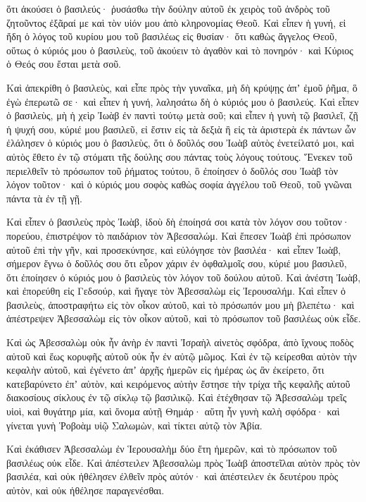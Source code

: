 {ὅτι ἀκούσει ὁ βασιλεύς· ῥυσάσθω τὴν δούλην αὐτοῦ ἐκ χειρὸς τοῦ ἀνδρὸς τοῦ ζητοῦντος ἐξᾶραί με καὶ τὸν υἱόν μου ἀπὸ κληρονομίας Θεοῦ.
Καὶ εἶπεν ἡ γυνή, εἰ ἤδη ὁ λόγος τοῦ κυρίου μου τοῦ βασιλέως εἰς θυσίαν· ὅτι καθὼς ἄγγελος Θεοῦ, οὕτως ὁ κύριός μου ὁ βασιλεὺς, τοῦ ἀκούειν τὸ ἀγαθὸν καὶ τὸ πονηρόν· καὶ Κύριος ὁ Θεός σου ἔσται μετὰ σοῦ.
\par }{\PP {}Καὶ ἀπεκρίθη ὁ βασιλεὺς, καὶ εἶπε πρὸς τὴν γυναῖκα, μὴ δὴ κρύψῃς ἀπʼ ἐμοῦ ῥῆμα, ὃ ἐγὼ ἐπερωτῶ σε· καὶ εἶπεν ἡ γυνή, λαλησάτω δὴ ὁ κύριός μου ὁ βασιλεύς.
Καὶ εἶπεν ὁ βασιλεὺς, μὴ ἡ χεὶρ Ἰωὰβ ἐν παντὶ τούτῳ μετὰ σοῦ; καὶ εἶπεν ἡ γυνὴ τῷ βασιλεῖ, ζῇ ἡ ψυχή σου, κύριέ μου βασιλεῦ, εἰ ἔστιν εἰς τὰ δεξιὰ ἢ εἰς τὰ ἀριστερὰ ἐκ πάντων ὧν ἐλάλησεν ὁ κύριός μου ὁ βασιλεὺς, ὅτι ὁ δοῦλός σου Ἰωὰβ αὐτὸς ἐνετείλατό μοι, καὶ αὐτὸς ἔθετο ἐν τῷ στόματι τῆς δούλης σου πάντας τοὺς λόγους τούτους.
Ἕνεκεν τοῦ περιελθεῖν τὸ πρόσωπον τοῦ ῥήματος τούτου, ὃ ἐποίησεν ὁ δοῦλός σου Ἰωὰβ τὸν λόγον τοῦτον· καὶ ὁ κύριός μου σοφὸς καθὼς σοφία ἀγγέλου τοῦ Θεοῦ, τοῦ γνῶναι πάντα τὰ ἐν τῇ γῇ.
\par }{\PP {}Καὶ εἶπεν ὁ βασιλεὺς πρὸς Ἰωὰβ, ἰδοὺ δὴ ἐποίησά σοι κατὰ τὸν λόγον σου τοῦτον· πορεύου, ἐπιστρέψον τὸ παιδάριον τὸν Ἀβεσσαλώμ.
Καὶ ἔπεσεν Ἰωὰβ ἐπὶ πρόσωπον αὐτοῦ ἐπὶ τὴν γῆν, καὶ προσεκύνησε, καὶ εὐλόγησε τὸν βασιλέα· καὶ εἶπεν Ἰωὰβ, σήμερον ἔγνω ὁ δοῦλός σου ὅτι εὗρον χάριν ἐν ὀφθαλμοῖς σου, κύριέ μου βασιλεῦ, ὅτι ἐποίησεν ὁ κύριός μου ὁ βασιλεὺς τὸν λόγον τοῦ δούλου αὐτοῦ.
Καὶ ἀνέστη Ἰωὰβ, καὶ ἐπορεύθη εἰς Γεδσούρ, καὶ ἤγαγε τὸν Ἀβεσσαλὼμ εἰς Ἰερουσαλήμ.
Καὶ εἶπεν ὁ βασιλεὺς, ἀποστραφήτω εἰς τὸν οἶκον αὐτοῦ, καὶ τὸ πρόσωπόν μου μὴ βλεπέτω· καὶ ἀπέστρεψεν Ἀβεσσαλὼμ εἰς τὸν οἶκον αὐτοῦ, καὶ τὸ πρόσωπον τοῦ βασιλέως οὐκ εἶδε.
\par }{\PP {}Καὶ ὡς Ἀβεσσαλὼμ οὐκ ἦν ἀνὴρ ἐν παντὶ Ἰσραὴλ αἰνετὸς σφόδρα, ἀπὸ ἴχνους ποδὸς αὐτοῦ καὶ ἕως κορυφῆς αὐτοῦ οὐκ ἦν ἐν αὐτῷ μῶμος.
Καὶ ἐν τῷ κείρεσθαι αὐτὸν τὴν κεφαλὴν αὐτοῦ, καὶ ἐγένετο ἀπʼ ἀρχῆς ἡμερῶν εἰς ἡμέρας ὡς ἂν ἐκείρετο, ὅτι κατεβαρύνετο ἐπʼ αὐτὸν, καὶ κειρόμενος αὐτὴν ἔστησε τὴν τρίχα τῆς κεφαλῆς αὐτοῦ διακοσίους σίκλους ἐν τῷ σίκλῳ τῷ βασιλικῷ.
Καὶ ἐτέχθησαν τῷ Ἀβεσσαλὼμ τρεῖς υἱοὶ, καὶ θυγάτηρ μία, καὶ ὄνομα αὐτῇ Θημάρ· αὕτη ἦν γυνὴ καλὴ σφόδρα· καὶ γίνεται γυνὴ Ῥοβοὰμ υἱῷ Σαλωμὼν, καὶ τίκτει αὐτῷ τὸν Ἀβία.
\par }{\PP {}Καὶ ἐκάθισεν Ἀβεσσαλὼμ ἐν Ἱερουσαλὴμ δύο ἔτη ἡμερῶν, καὶ τὸ πρόσωπον τοῦ βασιλέως οὐκ εἶδε.
Καὶ ἀπέστειλεν Ἀβεσσαλὼμ πρὸς Ἰωὰβ ἀποστεῖλαι αὐτὸν πρὸς τὸν βασιλέα, καὶ οὐκ ἠθέλησεν ἐλθεῖν πρὸς αὐτόν· καὶ ἀπέστειλεν ἐκ δευτέρου πρὸς αὐτὸν, καὶ οὐκ ἠθέλησε παραγενέσθαι.
}
